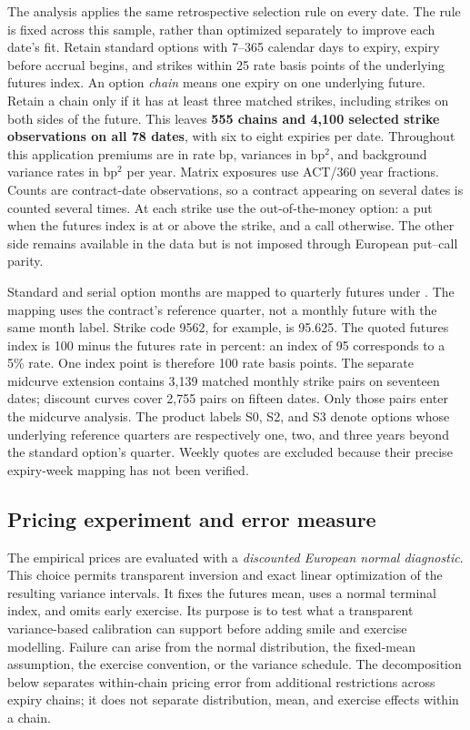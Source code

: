 The analysis applies the same retrospective selection rule on every date. The rule is fixed across this sample, rather than optimized separately to improve each date's fit. Retain standard options with 7--365 calendar days to expiry, expiry before accrual begins, and strikes within 25 rate basis points of the underlying futures index. An option \emph{chain} means one expiry on one underlying future. Retain a chain only if it has at least three matched strikes, including strikes on both sides of the future. This leaves \textbf{555 chains and 4,100 selected strike observations on all 78 dates}, with six to eight expiries per date. Throughout this application premiums are in rate bp, variances in bp$^2$, and background variance rates in bp$^2$ per year. Matrix exposures use ACT/360 year fractions. Counts are contract-date observations, so a contract appearing on several dates is counted several times. At each strike use the out-of-the-money option: a put when the futures index is at or above the strike, and a call otherwise. The other side remains available in the data but is not imposed through European put--call parity.

Standard and serial option months are mapped to quarterly futures under \citet{cme2026sr3options,cme2026sr3futures}. The mapping uses the contract's reference quarter, not a monthly future with the same month label. Strike code 9562, for example, is 95.625. The quoted futures index is 100 minus the futures rate in percent: an index of 95 corresponds to a 5\% rate. One index point is therefore 100 rate basis points. The separate midcurve extension contains 3,139 matched monthly strike pairs on seventeen dates; discount curves cover 2,755 pairs on fifteen dates. Only those pairs enter the midcurve analysis. The product labels S0, S2, and S3 denote options whose underlying reference quarters are respectively one, two, and three years beyond the standard option's quarter. Weekly quotes are excluded because their precise expiry-week mapping has not been verified.

\subsection{Pricing experiment and error measure}
The empirical prices are evaluated with a \emph{discounted European normal diagnostic}. This choice permits transparent inversion and exact linear optimization of the resulting variance intervals. It fixes the futures mean, uses a normal terminal index, and omits early exercise. Its purpose is to test what a transparent variance-based calibration can support before adding smile and exercise modelling. Failure can arise from the normal distribution, the fixed-mean assumption, the exercise convention, or the variance schedule. The decomposition below separates within-chain pricing error from additional restrictions across expiry chains; it does not separate distribution, mean, and exercise effects within a chain.

